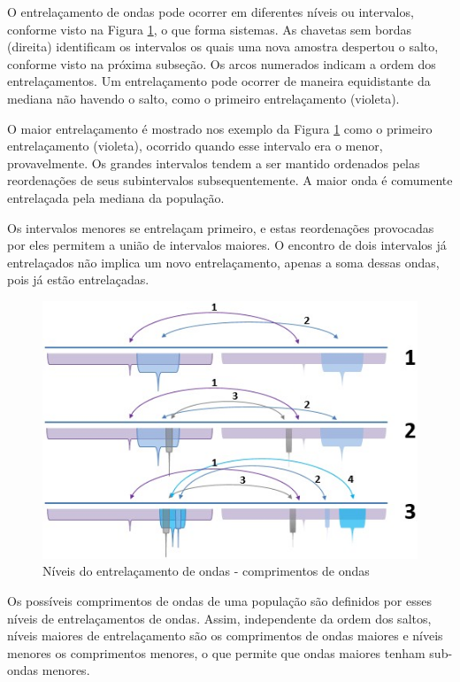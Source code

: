 O entrelaçamento de ondas pode ocorrer em diferentes níveis ou intervalos, conforme visto na Figura \ref{fig:consciousness_subconscious_entanglement}, o que forma sistemas. As chavetas sem bordas (direita) identificam os intervalos os quais uma nova amostra despertou o salto, conforme visto na próxima subseção. Os arcos numerados indicam a ordem dos entrelaçamentos. Um entrelaçamento pode ocorrer de maneira equidistante da mediana não havendo o salto, como o primeiro entrelaçamento (violeta).

O maior entrelaçamento é mostrado nos exemplo da Figura \ref{fig:consciousness_subconscious_entanglement} como o primeiro entrelaçamento (violeta), ocorrido quando esse intervalo era o menor, provavelmente. Os grandes intervalos tendem a ser mantido ordenados pelas reordenações de seus subintervalos subsequentemente. A maior onda é comumente entrelaçada pela mediana da população. 

Os intervalos menores se entrelaçam primeiro, e estas reordenações provocadas por eles permitem a união de intervalos maiores. O encontro de dois intervalos já entrelaçados não implica um novo entrelaçamento, apenas a soma dessas ondas, pois já estão entrelaçadas.
	\begin{figure}[H]
	\caption{Níveis do entrelaçamento de ondas - comprimentos de ondas}
	\label{fig:consciousness_subconscious_entanglement}
	\centering
	\includegraphics[scale=.8]{sections/images/consciousness_subconscious_entanglement.jpg}
	\end{figure}

Os possíveis comprimentos de ondas de uma população são definidos por esses níveis de entrelaçamentos de ondas. Assim, independente da ordem dos saltos, níveis maiores de entrelaçamento são os comprimentos de ondas maiores e níveis menores os comprimentos menores, o que permite que ondas maiores tenham sub-ondas menores. 


